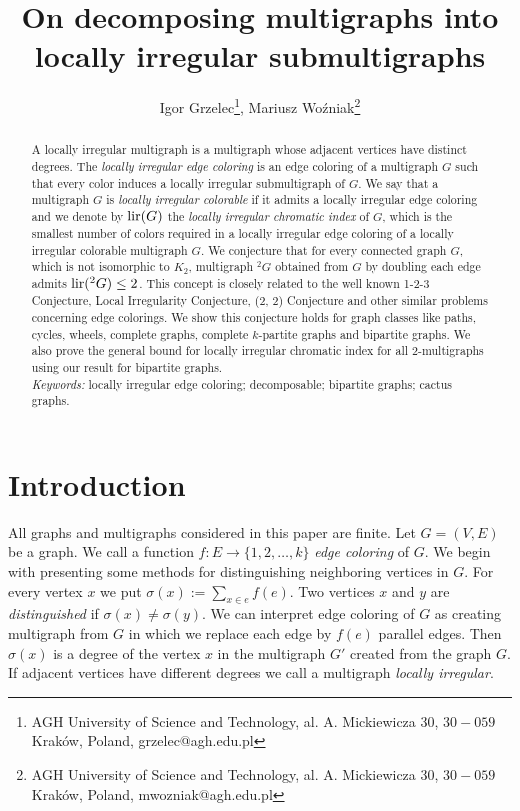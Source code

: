\documentclass[12pt]{article}
\begin{document}
\title{On decomposing multigraphs into locally irregular submultigraphs}
\author{Igor Grzelec\thanks{AGH University of Science and Technology, al. A. Mickiewicza 30, $30-059$  Krak\'ow, Poland, grzelec@agh.edu.pl}, Mariusz Woźniak\thanks{AGH University of Science and Technology, al. A. Mickiewicza 30, $30-059$  Krak\'ow, Poland, mwozniak@agh.edu.pl}}
\maketitle
\begin{abstract}
A locally irregular multigraph is a multigraph whose adjacent vertices have distinct degrees. The \textit{locally irregular edge coloring} is an edge coloring of a multigraph $G$ such that every color induces a locally irregular submultigraph of $G$. We say that a multigraph $G$ is \textit{locally irregular colorable} if it admits a locally irregular edge coloring and we denote by ${\rm lir}(G)$ the \textit{locally irregular chromatic index} of $G$, which is the smallest number of colors required in a locally irregular edge coloring of a locally irregular colorable multigraph $G$. We conjecture that for every connected graph $G$, which is not isomorphic to $K_2$, multigraph $^2G$ obtained from $G$ by doubling each edge admits ${\rm lir}(^2G)\leq 2$. This concept is closely related
to the well known 1-2-3 Conjecture, Local Irregularity Conjecture, (2, 2) Conjecture
and other similar problems concerning edge colorings. We show this conjecture holds for graph classes like paths, cycles, wheels, complete graphs, complete $k$-partite graphs and bipartite graphs. We also prove the general bound for locally irregular chromatic index for all 2-multigraphs using our result for bipartite graphs. \\

\textit{Keywords:} locally irregular edge coloring; decomposable; bipartite graphs; cactus graphs.
\end{abstract}
\section{Introduction}
All graphs and multigraphs considered in this paper are finite. Let $G=(V, E)$ be a graph. We call a function $f: E \rightarrow \{1, 2, \dots, k\}$ \textit{edge coloring} of $G$. We begin with presenting some methods for distinguishing neighboring vertices in $G$. For every vertex $x$ we put $\sigma (x):=\sum \limits_{x \in e}f(e)$. Two vertices $x$ and $y$ are \textit{distinguished} if $\sigma (x)\neq \sigma (y)$. We can interpret edge coloring of $G$ as creating multigraph from $G$ in which we replace each edge by $f(e)$ parallel edges. Then $\sigma (x)$ is a degree of the vertex $x$ in the multigraph $G'$ created from the graph $G$. If adjacent vertices have different degrees we call a multigraph \textit{locally irregular}.
\end{document}
